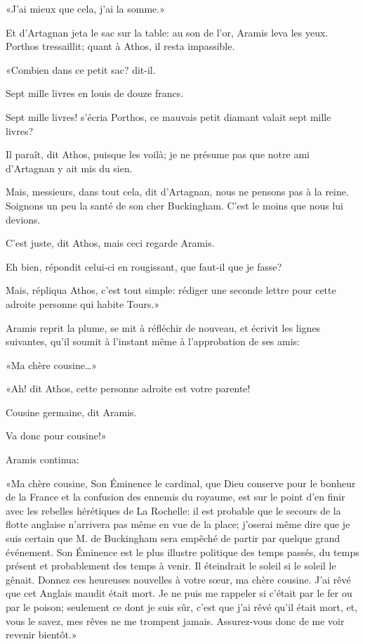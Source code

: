 «J'ai mieux que cela, j'ai la somme.» 

Et d'Artagnan jeta le sac sur la table: au son de l'or, Aramis leva les yeux. Porthos tressaillit; quant à Athos, il resta impassible. 

«Combien dans ce petit sac? dit-il. 

\speak  Sept mille livres en louis de douze francs. 

\speak  Sept mille livres! s'écria Porthos, ce mauvais petit diamant valait sept mille livres? 

\speak  Il paraît, dit Athos, puisque les voilà; je ne présume pas que notre ami d'Artagnan y ait mis du sien. 

\speak  Mais, messieurs, dans tout cela, dit d'Artagnan, nous ne pensons pas à la reine. Soignons un peu la santé de son cher Buckingham. C'est le moins que nous lui devions. 

\speak  C'est juste, dit Athos, mais ceci regarde Aramis. 

\speak  Eh bien, répondit celui-ci en rougissant, que faut-il que je fasse? 

\speak  Mais, répliqua Athos, c'est tout simple: rédiger une seconde lettre pour cette adroite personne qui habite Tours.» 

Aramis reprit la plume, se mit à réfléchir de nouveau, et écrivit les lignes suivantes, qu'il soumit à l'instant même à l'approbation de ses amis: 

«Ma chère cousine\dots» 

«Ah! dit Athos, cette personne adroite est votre parente! 

\speak  Cousine germaine, dit Aramis. 

\speak  Va donc pour cousine!» 

Aramis continua: 

«Ma chère cousine, Son Éminence le cardinal, que Dieu conserve pour le bonheur de la France et la confusion des ennemis du royaume, est sur le point d'en finir avec les rebelles hérétiques de La Rochelle: il est probable que le secours de la flotte anglaise n'arrivera pas même en vue de la place; j'oserai même dire que je suis certain que M. de Buckingham sera empêché de partir par quelque grand événement. Son Éminence est le plus illustre politique des temps passés, du temps présent et probablement des temps à venir. Il éteindrait le soleil si le soleil le gênait. Donnez ces heureuses nouvelles à votre sœur, ma chère cousine. J'ai rêvé que cet Anglais maudit était mort. Je ne puis me rappeler si c'était par le fer ou par le poison; seulement ce dont je suis sûr, c'est que j'ai rêvé qu'il était mort, et, vous le savez, mes rêves ne me trompent jamais. Assurez-vous donc de me voir revenir bientôt.» 

